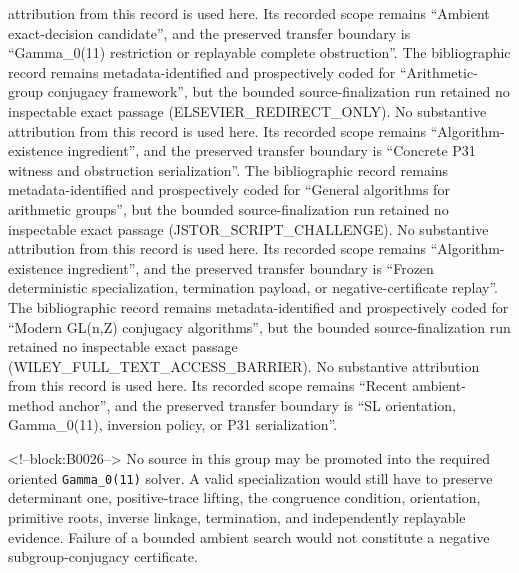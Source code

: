 \documentclass[11pt]{article}
\begin{document}
attribution from this record is used here.  Its recorded scope remains
``Ambient exact-decision candidate'', and the preserved transfer boundary is ``Gamma\_0(11) restriction or replayable complete obstruction''.
The bibliographic record \citep{P31-S11} remains metadata-identified and
prospectively coded for ``Arithmetic-group conjugacy framework'', but the bounded source-finalization
run retained no inspectable exact passage (ELSEVIER\_REDIRECT\_ONLY).  No substantive
attribution from this record is used here.  Its recorded scope remains
``Algorithm-existence ingredient'', and the preserved transfer boundary is ``Concrete P31 witness and obstruction serialization''.
The bibliographic record \citep{P31-S12} remains metadata-identified and
prospectively coded for ``General algorithms for arithmetic groups'', but the bounded source-finalization
run retained no inspectable exact passage (JSTOR\_SCRIPT\_CHALLENGE).  No substantive
attribution from this record is used here.  Its recorded scope remains
``Algorithm-existence ingredient'', and the preserved transfer boundary is ``Frozen deterministic specialization, termination payload, or negative-certificate replay''.
The bibliographic record \citep{P31-S13} remains metadata-identified and
prospectively coded for ``Modern GL(n,Z) conjugacy algorithms'', but the bounded source-finalization
run retained no inspectable exact passage (WILEY\_FULL\_TEXT\_ACCESS\_BARRIER).  No substantive
attribution from this record is used here.  Its recorded scope remains
``Recent ambient-method anchor'', and the preserved transfer boundary is ``SL orientation, Gamma\_0(11), inversion policy, or P31 serialization''.

<!--block:B0026-->
No source in this group may be promoted into the required oriented
\texttt{Gamma\_0(11)} solver. A valid specialization would still have to
preserve determinant one, positive-trace lifting, the congruence
condition, orientation, primitive roots, inverse linkage, termination,
and independently replayable evidence. Failure of a bounded ambient
search would not constitute a negative subgroup-conjugacy certificate.
\end{document}
